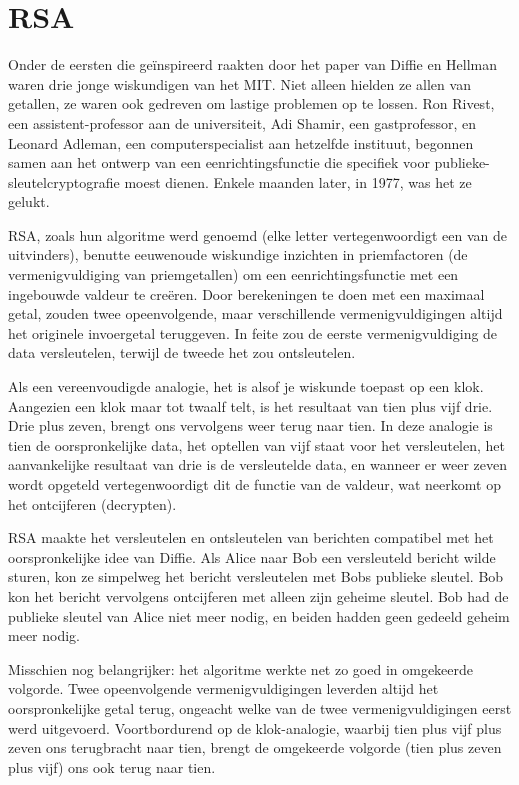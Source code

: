 \documentclass[
  a5paper,
  smalldemyvopaper,11pt,twoside,onecolumn,openright,extrafontsizes,
hidelinks]{memoir}
\begin{document}
\vspace{-1em}

\section{RSA}\label{rsa}

Onder de eersten die geïnspireerd raakten door het paper van Diffie en
Hellman waren drie jonge wiskundigen van het MIT. Niet alleen hielden ze
allen van getallen, ze waren ook gedreven om lastige problemen op te
lossen. Ron Rivest, een assistent-professor aan de universiteit, Adi
Shamir, een gastprofessor, en Leonard Adleman, een computerspecialist
aan hetzelfde instituut, begonnen samen aan het ontwerp van een
eenrichtingsfunctie die specifiek voor publieke-sleutelcryptografie
moest dienen. Enkele maanden later, in 1977, was het ze gelukt.

RSA, zoals hun algoritme werd genoemd (elke letter vertegenwoordigt een
van de uitvinders), benutte eeuwenoude wiskundige inzichten in
priemfactoren (de vermenigvuldiging van priemgetallen) om een
eenrichtingsfunctie met een ingebouwde valdeur te creëren. Door
berekeningen te doen met een maximaal getal, zouden twee opeenvolgende,
maar verschillende vermenigvuldigingen altijd het originele invoergetal
teruggeven. In feite zou de eerste vermenigvuldiging de data
versleutelen, terwijl de tweede het zou ontsleutelen.

Als een vereenvoudigde analogie, het is alsof je wiskunde toepast op een
klok. Aangezien een klok maar tot twaalf telt, is het resultaat van tien
plus vijf drie. Drie plus zeven, brengt ons vervolgens weer terug naar
tien. In deze analogie is tien de oorspronkelijke data, het optellen van
vijf staat voor het versleutelen, het aanvankelijke resultaat van drie
is de versleutelde data, en wanneer er weer zeven wordt opgeteld
vertegenwoordigt dit de functie van de valdeur, wat neerkomt op het
ontcijferen (decrypten).

RSA maakte het versleutelen en ontsleutelen van berichten compatibel met
het oorspronkelijke idee van Diffie. Als Alice naar Bob een versleuteld
bericht wilde sturen, kon ze simpelweg het bericht versleutelen met Bobs
publieke sleutel. Bob kon het bericht vervolgens ontcijferen met alleen
zijn geheime sleutel. Bob had de publieke sleutel van Alice niet meer
nodig, en beiden hadden geen gedeeld geheim meer nodig.

Misschien nog belangrijker: het algoritme werkte net zo goed in
omgekeerde volgorde. Twee opeenvolgende vermenigvuldigingen leverden
altijd het oorspronkelijke getal terug, ongeacht welke van de twee
vermenigvuldigingen eerst werd uitgevoerd. Voortbordurend op de
klok-analogie, waarbij tien plus vijf plus zeven ons terugbracht naar
tien, brengt de omgekeerde volgorde (tien plus zeven plus vijf) ons ook
terug naar tien.
\end{document}
